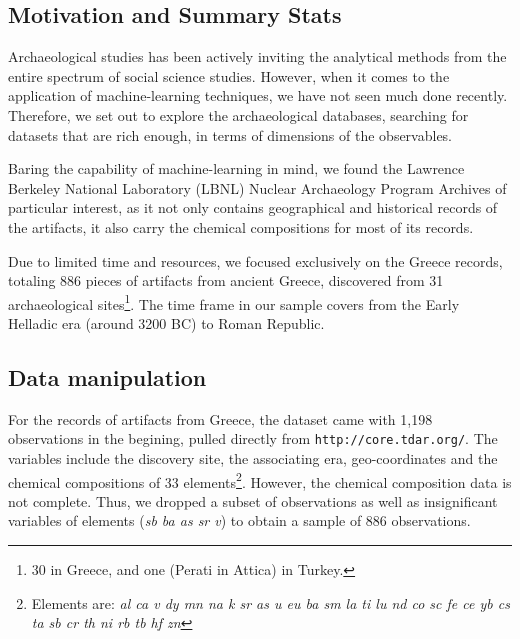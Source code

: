\subsection{Motivation and Summary Stats}
Archaeological studies has been actively inviting the analytical methods from
the entire spectrum of social science studies. However, when it comes to the
application of machine-learning techniques, we have not seen much done recently.
Therefore, we set out to explore the archaeological databases, searching for
datasets that are rich enough, in terms of dimensions of the observables.

Baring the capability of machine-learning in mind, we found the 
Lawrence Berkeley National Laboratory (LBNL) Nuclear Archaeology Program
Archives %
of particular interest, as it not only contains geographical and historical
records of the artifacts, it also carry the chemical compositions for most of
its records.


Due to limited time and resources, we focused exclusively on the Greece records,
totaling 886 pieces of artifacts from ancient Greece, discovered from 31
archaeological sites\footnote{30 in Greece, and one (Perati in Attica) in
Turkey.}.  The time frame in our sample covers from the Early Helladic era
(around 3200 BC) to Roman Republic. 

\subsection{Data manipulation}
For the records of artifacts from Greece, the dataset came with 1,198
observations in the begining, pulled directly from \verb|http://core.tdar.org/|.
The variables include the discovery site, the associating era, geo-coordinates
and the chemical compositions of 33 elements\footnote{Elements are:
    \textit{al ca v dy mn na k sr as u eu ba sm la ti lu nd co sc fe ce yb cs ta
    sb cr th ni rb tb hf zn}
}. However, the chemical composition
data is not complete. Thus, we dropped a subset of observations as well as
insignificant variables of elements (\textit{sb ba as sr v}) to obtain a sample
of 886 observations. 


